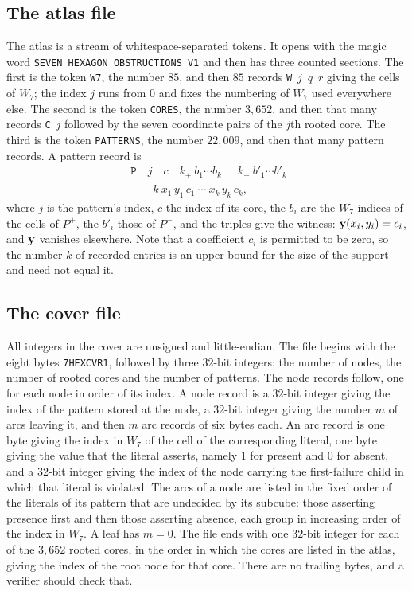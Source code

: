 \documentclass[11pt]{article}
\theoremstyle{definition}
\begin{document}
\subsection{The atlas file}

The atlas is a stream of whitespace-separated tokens.  It opens with the
magic word \texttt{SEVEN\_\allowbreak HEXAGON\_\allowbreak OBSTRUCTIONS\_\allowbreak V1} and then has three
counted sections.  The first is the token \texttt{W7}, the number $85$, and
then $85$ records \texttt{W}~$j$~$q$~$r$ giving the cells of $W_7$; the index
$j$ runs from $0$ and fixes the numbering of $W_7$ used everywhere else.  The
second is the token \texttt{CORES}, the number $3{,}652$, and then that many
records \texttt{C}~$j$ followed by the seven coordinate pairs of the $j$th
rooted core.  The third is the token \texttt{PATTERNS}, the number $22{,}009$,
and then that many pattern records.  A pattern record is
\[
\begin{aligned}
 &\texttt{P}\quad j\quad c\quad
  k_{+}\ b_1\cdots b_{k_{+}}\quad
  k_{-}\ b'_1\cdots b'_{k_{-}}\\
 &\qquad k\ x_1\,y_1\,c_1\ \cdots\ x_k\,y_k\,c_k ,
\end{aligned}
\]
where $j$ is the pattern's index, $c$ the index of its core, the $b_i$ are the
$W_7$-indices of the cells of $P^{+}$, the $b'_i$ those of $P^{-}$, and the
triples give the witness: ${\mathbf y}(x_i,y_i)=c_i$, and ${\mathbf y}$ vanishes elsewhere.
Note that a coefficient $c_i$ is permitted to be zero, so the number $k$ of
recorded entries is an upper bound for the size of the support and need not
equal it.

\subsection{The cover file}

All integers in the cover are unsigned and little-endian.  The file begins
with the eight bytes \texttt{7HEXCVR1}, followed by three $32$-bit integers:
the number of nodes, the number of rooted cores and the number of patterns.
The node records follow, one for each node in order of its index.  A node
record is a $32$-bit integer giving the index of the pattern stored at the
node, a $32$-bit integer giving the number $m$ of arcs leaving it, and then
$m$ arc records of six bytes each.  An arc record is one byte giving the
index in $W_7$ of the cell of the corresponding literal, one byte giving the
value that the literal asserts, namely $1$ for present and $0$ for absent,
and a $32$-bit integer giving the index of the node carrying the
first-failure child in which that literal is violated.  The arcs of a node
are listed in the fixed order of the literals of its pattern that are
undecided by its subcube: those asserting presence first and then those
asserting absence, each group in increasing order of the index in $W_7$.  A
leaf has $m=0$.  The file ends with one $32$-bit integer for each of the
$3{,}652$ rooted cores, in the order in which the cores are listed in the
atlas, giving the index of the root node for that core.  There are no
trailing bytes, and a verifier should check that.
\end{document}
